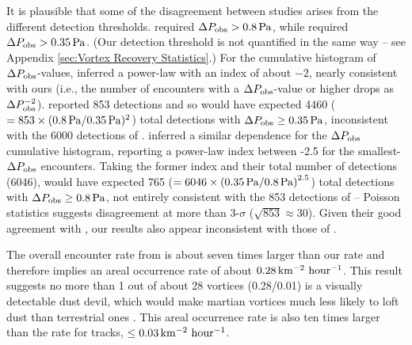 \documentclass[linenumbers,trackchanges]{aastex63}
\begin{document}
It is plausible that some of the disagreement between studies arises from the different detection thresholds. \citet{2021Icar..35514119L} required $\Delta P_{\rm obs} > 0.8\,{\rm Pa}$, while \citet{2021JGRE..12606511S} required $\Delta P_{\rm obs} > 0.35\,{\rm Pa}$. (Our detection threshold is not quantified in the same way -- see Appendix \ref{sec:Vortex Recovery Statistics}.) For the cumulative histogram of $\Delta P_{\rm obs}$-values, \citet{2021Icar..35514119L} inferred a power-law with an index of about $-2$, nearly consistent with ours (i.e., the number of encounters with a $\Delta P_{\rm obs}$-value or higher drops as $\Delta P_{\rm obs}^{-2}$). \citet{2021Icar..35514119L} reported 853 detections and so would have expected 4460 ($= 853 \times (0.8\,{\rm Pa}/0.35\,{\rm Pa})^2$) total detections with $\Delta P_{\rm obs} \geq 0.35\,{\rm Pa}$, inconsistent with the 6000 detections of \citet{2021JGRE..12606511S}. \citet{2021JGRE..12606511S} inferred a similar dependence for the $\Delta P_{\rm obs}$ cumulative histogram, reporting a power-law index between -2.5 for the smallest-$\Delta P_{\rm obs}$ encounters. Taking the former index and their total number of detections (6046), \citet{2021JGRE..12606511S} would have expected 765 ($= 6046 \times \left(0.35\,{\rm Pa}/0.8\,{\rm Pa} \right)^{2.5}$) total detections with $\Delta P_{\rm obs} \geq 0.8\,{\rm Pa}$, not entirely consistent with the 853 detections of \citet{2021Icar..35514119L} -- Poisson statistics suggests disagreement at more than 3-$\sigma$ ($\sqrt{853} \approx 30$). Given their good agreement with \citet{2021Icar..35514119L}, our results also appear inconsistent with those of \citet{2021JGRE..12606511S}.

The overall encounter rate from \citet{2021JGRE..12606511S} is about seven times larger than our rate and therefore implies an areal occurrence rate of about $0.28\,{\rm km^{-2}\ hour^{-1}}$. This result suggests no more than 1 out of about 28 vortices (0.28/0.01) is a visually detectable dust devil, which would make martian vortices much less likely to loft dust than terrestrial ones \citep{LORENZ20151}. This areal occurrence rate is also ten times larger than the rate for tracks, $\le 0.03\,{\rm km^{-2}\ hour^{-1}}$.
\end{document}
